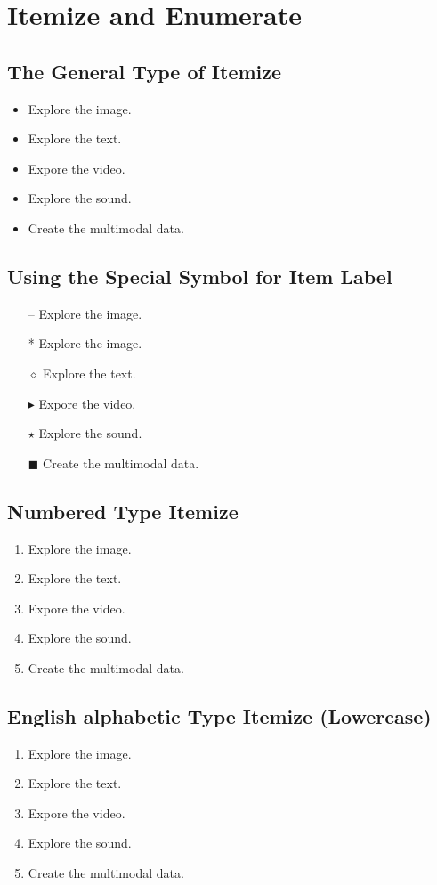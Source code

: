 \documentclass[11pt]{article}
\begin{document}
{\color[HTML]{38B25A}


\section{Itemize and Enumerate}
\label{ref:itemize}

\subsection{The General Type of Itemize}
\begin{itemize}
\item Explore the image.
\item Explore the text.
\item Expore the video.
\item Explore the sound.
\item Create the multimodal data.
\end{itemize}

\subsection{Using the Special Symbol for Item Label}
\begin{itemize}
\item[--] Explore the image.
\item[*] Explore the image.
\item[$\diamond$] Explore the text.
\item[$\blacktriangleright$] Expore the video.
\item[$\star$] Explore the sound.
\item[$\blacksquare$] Create the multimodal data.
\end{itemize}


\subsection{Numbered Type Itemize}
\begin{enumerate}
\item Explore the image.
\item Explore the text.
\item Expore the video.
\item Explore the sound.
\item Create the multimodal data.
\end{enumerate}

\subsection{English alphabetic Type Itemize (Lowercase)}
\begin{enumerate}[A]
\item Explore the image.
\item Explore the text.
\item Expore the video.
\item Explore the sound.
\item Create the multimodal data.
\end{enumerate}


}
\end{document}
